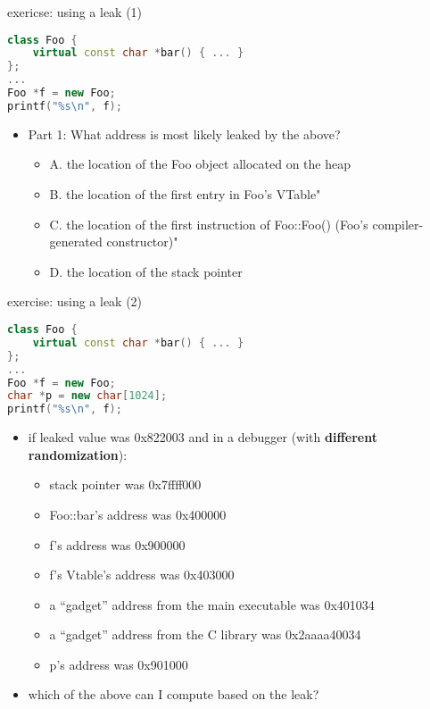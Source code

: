 \begin{frame}[fragile,label=useLeak1]{exericse: using a leak (1)}
\begin{lstlisting}[language=C++,style=small]
class Foo {
    virtual const char *bar() { ... }
};
...
Foo *f = new Foo;
printf("%s\n", f);
\end{lstlisting}
\begin{itemize}
\item Part 1: What address is most likely leaked by the above?
    \begin{itemize}
    \item A. the location of the Foo object allocated on the heap
    \item B. the location of the first entry in Foo's VTable"
    \item C. the location of the first instruction of Foo::Foo() (Foo's compiler-generated constructor)"
    \item D. the location of the stack pointer
    \end{itemize}
\end{itemize}
\end{frame}


\begin{frame}[fragile,label=useLeak2]{exercise: using a leak (2)}
\begin{lstlisting}[language=C++,style=script]
class Foo {
    virtual const char *bar() { ... }
};
...
Foo *f = new Foo;
char *p = new char[1024];
printf("%s\n", f);
\end{lstlisting}
\begin{itemize}
\item if leaked value was 0x822003 and in a debugger (with \textbf{different randomization}):
    \begin{itemize}
    \item stack pointer was 0x7ffff000
    \item Foo::bar's address was 0x400000
    \item f's address was 0x900000
    \item f's Vtable's address was 0x403000
    \item a ``gadget'' address from the main executable was 0x401034
    \item a ``gadget'' address from the C library was 0x2aaaa40034
    \item p's address was 0x901000
    \end{itemize}
\item which of the above can I compute based on the leak?
\end{itemize}
\end{frame}
